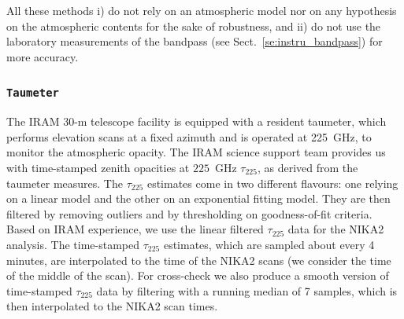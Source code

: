 All these methods i) do not rely on an atmospheric model nor on any
hypothesis on the atmospheric contents for the sake of robustness, and
ii) do not use the laboratory measurements of the bandpass (see 
Sect.~\ref{se:instru_bandpass}) for more accuracy.  

\subsubsection{{\tt Taumeter}}
\label{se:taumeter-method}

The IRAM 30-m telescope facility is equipped with a resident taumeter,
which performs elevation scans at a fixed azimuth and is operated at
225~GHz, to monitor the atmospheric opacity. The IRAM science support
team provides us with time-stamped zenith opacities at $225$~GHz
$\tau_{225}$, as derived from the taumeter measures. The
$\tau_{225}$ estimates come in two different flavours: one relying
on a linear model and the other on an exponential fitting model. They
are then filtered by removing outliers and by thresholding on
goodness-of-fit criteria.
Based on IRAM experience, we use the linear filtered $\tau_{225}$
data for the NIKA2 analysis. The time-stamped $\tau_{225}$ estimates,
which are sampled about every 4 minutes, are interpolated to the time
of the NIKA2 scans (we consider the time of the middle of the
scan). For cross-check we also produce a smooth version of time-stamped
$\tau_{225}$ data by
filtering with a running median of 7 samples, which is then
interpolated to the NIKA2 scan times.

